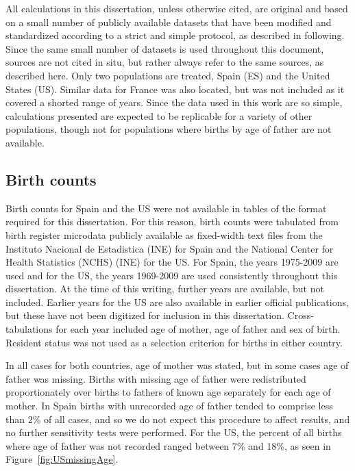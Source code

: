 All calculations in this dissertation, unless otherwise cited, are original 
and based on a small number of publicly available datasets that have
been modified and standardized according to a strict and simple protocol, as
described in following. Since the same small number of datasets
is used throughout this document, sources are not cited in situ, but rather
always refer to the same sources, as described here. Only two populations are
treated, Spain (ES) and the United States (US). Similar data for France was also
located, but was not included as it covered a shorted range of years. 
Since the data used in this work are so simple, calculations presented are
expected to be replicable for a variety of other populations, though not for
populations where births by age of father are not available.

\subsection{Birth counts}
Birth counts for Spain and the US were not available in tables of the format
required for this dissertation. For this reason, birth counts were tabulated from birth
register microdata publicly available as fixed-width text files from the 
Instituto Nacional de Estadistica (INE)\citep{MNPnacimientos} for Spain and the
National Center for Health Statistics (NCHS) (INE)\citep{NCHS19692009} for the US. For Spain, 
the years 1975-2009 are used and for the US, the years 1969-2009 are used
consistently throughout this dissertation. At the time of this writing, further
years are available, but not included. Earlier years for the US are also
available in earlier official publications, but these have not been digitized
for inclusion in this dissertation. Cross-tabulations for each year included age
of mother, age of father and sex of birth. Resident status was not used as a
selection criterion for births in either country.

In all cases for both countries, age of mother was
stated, but in some cases age of father was missing. Births with missing age of
father were redistributed proportionately over births to fathers of known age 
separately for each age of mother. In Spain births with unrecorded age of father 
tended to comprise less than 2\% of
all cases, and so we do not expect this procedure to affect
results, and no further sensitivity tests were performed. For the US, the
percent of all births where age of father was not recorded ranged between 7\%
and 18\%, as seen in Figure~\ref{fig:USmissingAge}. 

